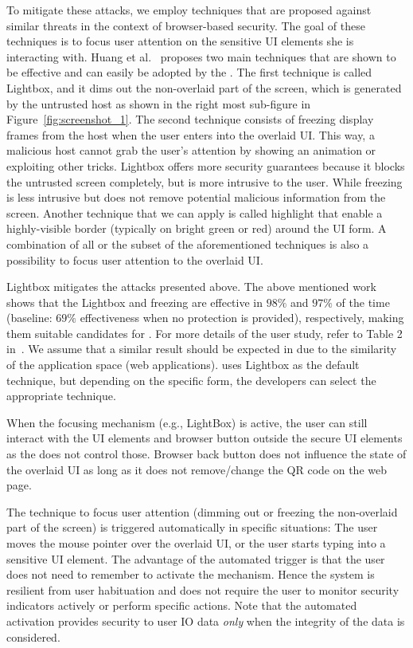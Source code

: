 To mitigate these attacks, we employ techniques that are proposed against similar threats in the context of browser-based security. The goal of these techniques is to focus user attention on the sensitive UI elements she is interacting with. Huang et al.~\cite{huang2012clickjacking} proposes two main techniques that are shown to be effective and can easily be adopted by the \device.  The first technique is called Lightbox, and it dims out the non-overlaid part of the screen, which is generated by the untrusted host as shown in the right most sub-figure in Figure~\ref{fig:screenshot_1}. The second technique consists of freezing display frames from the host when the user enters into the overlaid UI. This way, a malicious host cannot grab the user's attention by showing an animation or exploiting other tricks.
Lightbox offers more security guarantees because it blocks the untrusted screen completely, but is more intrusive to the user. While freezing is less intrusive but does not remove potential malicious information from the screen. Another technique that we can apply is called highlight that enable a highly-visible border (typically on bright green or red) around the UI form. A combination of all or the subset of the aforementioned techniques is also a possibility to focus user attention to the overlaid UI.

Lightbox mitigates the attacks presented above. The above mentioned work~\cite{huang2012clickjacking} shows that the Lightbox and freezing are effective in $98\%$ and $97\%$ of the time (baseline: $69\%$ effectiveness when no protection is provided), respectively, making them suitable candidates for \name. For more details of the user study, refer to Table 2 in~\cite{huang2012clickjacking}. We assume that a similar result should be expected in \name due to the similarity of the application space (web applications). \device uses Lightbox as the default technique, but depending on the specific form, the developers can select the appropriate technique.

When the focusing mechanism (e.g., LightBox) is active, the user can still interact with the UI elements and browser button outside the secure UI elements as the \device does not control those. Browser back button does not influence the state of the overlaid UI as long as it does not remove/change the QR code on the web page.


 The technique to focus user attention (dimming out or freezing the non-overlaid part of the screen) is triggered automatically in specific situations: The user moves the mouse pointer over the overlaid UI, or the user starts typing into a sensitive UI element. 
The advantage of the automated trigger is that the user does not need to remember to activate the mechanism. Hence the system is resilient from user habituation and does not require the user to monitor security indicators actively or perform specific actions. Note that the automated activation provides security to user IO data \emph{only} when the integrity of the data is considered.


